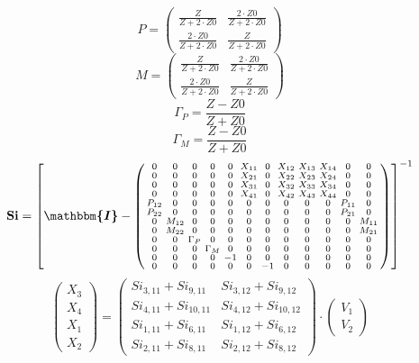 \[ P=\left(\begin{smallmatrix} \frac{Z}{Z+2\cdot Z0} & \frac{2\cdot
Z0}{Z+2\cdot Z0} \\ \frac{2\cdot Z0}{Z+2\cdot Z0} & \frac{Z}{Z+2\cdot
Z0} \end{smallmatrix}\right) \]
\[ M=\left(\begin{smallmatrix} \frac{Z}{Z+2\cdot Z0} & \frac{2\cdot
Z0}{Z+2\cdot Z0} \\ \frac{2\cdot Z0}{Z+2\cdot Z0} & \frac{Z}{Z+2\cdot
Z0} \end{smallmatrix}\right) \]
\[ \Gamma_P=\frac{ Z -Z0}{ Z +Z0} \]
\[ \Gamma_M=\frac{ Z -Z0}{ Z +Z0} \]
\[ \mathbf{Si} = \left[ \boldsymbol{\mathbbm{I}}  -
\left(\begin{smallmatrix} 0 & 0 & 0 & 0 & 0 & X_{11} & 0 & X_{12} &
X_{13} & X_{14} & 0 & 0 \\ 0 & 0 & 0 & 0 & 0 & X_{21} & 0 & X_{22} &
X_{23} & X_{24} & 0 & 0 \\ 0 & 0 & 0 & 0 & 0 & X_{31} & 0 & X_{32} &
X_{33} & X_{34} & 0 & 0 \\ 0 & 0 & 0 & 0 & 0 & X_{41} & 0 & X_{42} &
X_{43} & X_{44} & 0 & 0 \\ P_{12} & 0 & 0 & 0 & 0 & 0 & 0 & 0 & 0 & 0
& P_{11} & 0 \\ P_{22} & 0 & 0 & 0 & 0 & 0 & 0 & 0 & 0 & 0 & P_{21} &
0 \\ 0 & M_{12} & 0 & 0 & 0 & 0 & 0 & 0 & 0 & 0 & 0 & M_{11} \\ 0 &
M_{22} & 0 & 0 & 0 & 0 & 0 & 0 & 0 & 0 & 0 & M_{21} \\ 0 & 0 &
\Gamma_{P} & 0 & 0 & 0 & 0 & 0 & 0 & 0 & 0 & 0 \\ 0 & 0 & 0 &
\Gamma_{M} & 0 & 0 & 0 & 0 & 0 & 0 & 0 & 0 \\ 0 & 0 & 0 & 0 & -1 & 0 &
0 & 0 & 0 & 0 & 0 & 0 \\ 0 & 0 & 0 & 0 & 0 & 0 & -1 & 0 & 0 & 0 & 0 &
0 \end{smallmatrix}\right) \right]^{-1} \]
\[ \left(\begin{array}{c} X_{3} \\ X_{4} \\ X_{1} \\ X_{2}
\end{array}\right)=\left(\begin{smallmatrix} Si_{3,11} + Si_{9,11} &
Si_{3,12} + Si_{9,12} \\ Si_{4,11} + Si_{10,11} & Si_{4,12} +
Si_{10,12} \\ Si_{1,11} + Si_{6,11} & Si_{1,12} + Si_{6,12} \\
Si_{2,11} + Si_{8,11} & Si_{2,12} + Si_{8,12}
\end{smallmatrix}\right)\cdot \left(\begin{array}{c} V_{1} \\ V_{2}
\end{array}\right) \]
